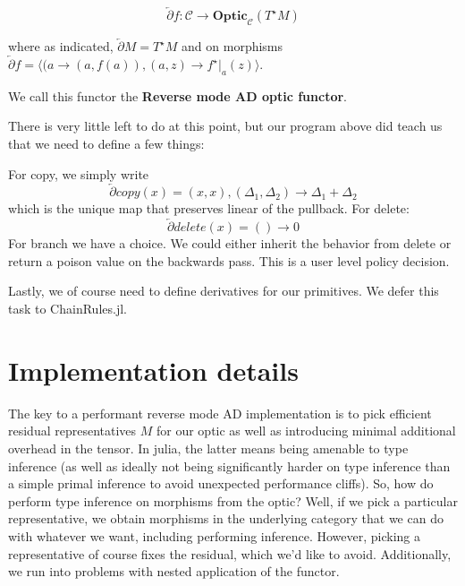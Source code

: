 \documentclass[letterpaper, 10 pt, conference]{ieeeconf}  %
\newcommand{\Optic}{\textbf{Optic}}
\begin{document}
\[
\overleftarrow{\partial} f: \mathcal{C} \to \Optic_{\mathcal{C}}(T^\star M)
\]

where as indicated, $\overleftarrow{\partial} M = T^\star M$ and on morphisms
$\overleftarrow{\partial} f = \langle (a\to(a,f(a)), (a, z) \to f^\star|_{a}(z) \rangle$.

We call this functor the \textbf{Reverse mode AD optic functor}.

There is very little left to do at this point, but our program above did teach
us that we need to define a few things:

For copy, we simply write
\[
    \overleftarrow{\partial} copy(x) = (x, x), (\Delta_1, \Delta_2) \to \Delta_1 + \Delta_2
\]
which is the unique map that preserves linear of the pullback. For delete:
\[
    \overleftarrow{\partial} delete(x) = ()\to 0
\]
For branch we have a choice. We could either inherit the behavior from delete
or return a poison value on the backwards pass. This is a user level policy decision.

Lastly, we of course need to define derivatives for our primitives. We defer
this task to ChainRules.jl.

\section{Implementation details}

The key to a performant reverse mode AD implementation is to pick
efficient residual representatives $M$ for our optic as well as introducing
minimal additional overhead in the tensor. In julia, the latter means
being amenable to type inference (as well as ideally not being significantly harder
on type inference than a simple primal inference to avoid unexpected performance
cliffs). So, how do perform type inference on morphisms from the optic? Well,
if we pick a particular representative, we obtain morphisms in the underlying
category that we can do with whatever we want, including performing inference.
However, picking a representative of course fixes the residual, which we'd like
to avoid. Additionally, we run into problems with nested application of the
functor.


{}
\end{document}
